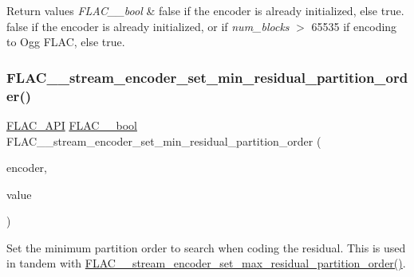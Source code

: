 \begin{DoxyRetVals}{Return values}
{\em F\+L\+A\+C\+\_\+\+\_\+bool} & {\ttfamily false} if the encoder is already initialized, else {\ttfamily true}. {\ttfamily false} if the encoder is already initialized, or if {\itshape num\+\_\+blocks} $>$ 65535 if encoding to Ogg F\+L\+AC, else {\ttfamily true}. \\
\hline
\end{DoxyRetVals}
\mbox{\label{group__flac__stream__encoder_gae3e2dd204f276d051bf1a118383bfda2}} 
\subsubsection{\texorpdfstring{F\+L\+A\+C\+\_\+\+\_\+stream\+\_\+encoder\+\_\+set\+\_\+min\+\_\+residual\+\_\+partition\+\_\+order()}{FLAC\_\_stream\_encoder\_set\_min\_residual\_partition\_order()}}
{\footnotesize\ttfamily \hyperlink{group__flac__export_ga56ca07df8a23310707732b1c0007d6f5}{F\+L\+A\+C\+\_\+\+A\+PI} \hyperlink{ordinals_8h_a95103469f1cbd78b8cf250194985b34e}{F\+L\+A\+C\+\_\+\+\_\+bool} F\+L\+A\+C\+\_\+\+\_\+stream\+\_\+encoder\+\_\+set\+\_\+min\+\_\+residual\+\_\+partition\+\_\+order (\begin{DoxyParamCaption}\item[{\hyperlink{struct_f_l_a_c_____stream_encoder}{F\+L\+A\+C\+\_\+\+\_\+\+Stream\+Encoder} $\ast$}]{encoder,  }\item[{unsigned}]{value }\end{DoxyParamCaption})}

Set the minimum partition order to search when coding the residual. This is used in tandem with \hyperlink{group__flac__stream__encoder_ga6de153da5a8eeeb1be2271c27fa58b37}{F\+L\+A\+C\+\_\+\+\_\+stream\+\_\+encoder\+\_\+set\+\_\+max\+\_\+residual\+\_\+partition\+\_\+order()}.


